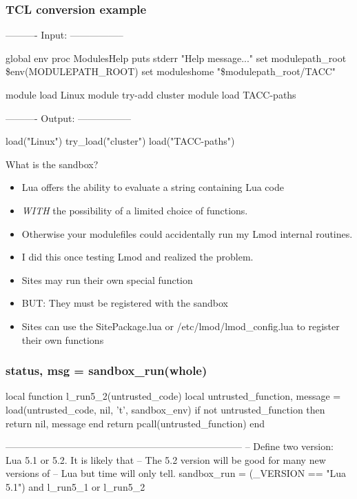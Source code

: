\documentclass{beamer}
\begin{document}
\begin{frame}[fragile]
\begin{frame}[fragile]
    \frametitle{TCL conversion example}
 {\tiny
   \begin{semiverbatim}
---------- Input: -----------------

global env
proc ModulesHelp { } {
puts stderr "Help message..."
}
set modulepath\_root  \$env(MODULEPATH\_ROOT)
set moduleshome     "\$modulepath\_root/TACC"

module load Linux
module try-add cluster
module load TACC-paths

---------- Output: -----------------

load("Linux")
try_load("cluster")
load("TACC-paths")
    \end{semiverbatim}
}
\end{frame}


\begin{frame}{What is the sandbox?}
  \begin{itemize}
    \item Lua offers the ability to evaluate a string containing Lua
      code
    \item \emph{WITH} the possibility of a limited choice of
      functions.
    \item Otherwise your modulefiles could accidentally run my Lmod
      internal routines.
    \item I did this once testing Lmod and realized the problem.
    \item Sites may run their own special function
    \item BUT: They must be registered with the sandbox 
    \item Sites can use the SitePackage.lua or
      /etc/lmod/lmod\_config.lua to register their own functions
  \end{itemize}
\end{frame}

\begin{frame}[fragile]
    \frametitle{status, msg = sandbox\_run(whole)}
 {\tiny
    \begin{semiverbatim}
local function l\_run5\_2(untrusted\_code)
  local untrusted\_function, message = load(untrusted\_code, nil, 't', sandbox\_env)
  if not untrusted\_function then return nil, message end
  return pcall(untrusted\_function)
end

--------------------------------------------------------------------------
-- Define two version: Lua 5.1 or 5.2.  It is likely that
-- The 5.2 version will be good for many new versions of
-- Lua but time will only tell.
sandbox\_run = (\_VERSION == "Lua 5.1") and l\_run5\_1 or l\_run5\_2
    \end{semiverbatim}
}
\end{frame}



\end{frame}
\end{document}
